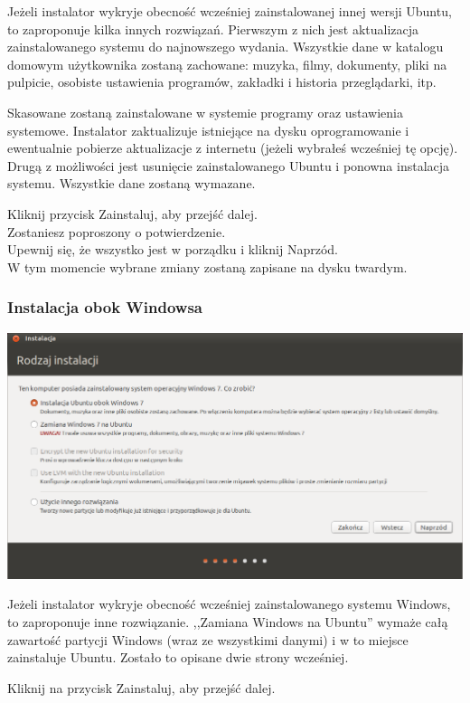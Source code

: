 Jeżeli instalator wykryje obecność wcześniej zainstalowanej innej wersji Ubuntu, to zaproponuje kilka innych rozwiązań.
Pierwszym z nich jest aktualizacja zainstalowanego systemu do najnowszego wydania. Wszystkie dane w katalogu domowym użytkownika zostaną zachowane: muzyka, filmy, dokumenty, pliki na pulpicie, osobiste ustawienia programów, zakładki i historia przeglądarki, itp.

Skasowane zostaną zainstalowane w systemie programy oraz ustawienia systemowe. Instalator zaktualizuje istniejące na dysku oprogramowanie i ewentualnie pobierze aktualizacje z internetu (jeżeli wybrałeś wcześniej tę opcję).
Drugą z możliwości jest usunięcie zainstalowanego Ubuntu i ponowna instalacja systemu. Wszystkie dane zostaną wymazane.
\begin{flushright}
Kliknij przycisk \textcolor{ubuntu_orange}{Zainstaluj}, aby przejść dalej.\\
Zostaniesz poproszony o potwierdzenie.\\
Upewnij się, że wszystko jest w porządku i kliknij \textcolor{ubuntu_orange}{Naprzód}.\\
W tym momencie wybrane zmiany zostaną zapisane na dysku twardym.
\end{flushright}
\clearpage
\subsubsection{Instalacja obok Windowsa}
\begin{center}
	\includegraphics[width=\linewidth]{images/instalator_partycjonowanie_obok_wondows7.png}
\end{center}

Jeżeli instalator wykryje obecność wcześniej zainstalowanego systemu Windows, to zaproponuje inne rozwiązanie. ,,Zamiana Windows na Ubuntu'' wymaże całą zawartość partycji Windows (wraz ze wszystkimi danymi) i w to miejsce zainstaluje Ubuntu. Zostało to opisane dwie strony wcześniej.
\begin{flushright}
Kliknij na przycisk \textcolor{ubuntu_orange}{Zainstaluj}, aby przejść dalej.
\end{flushright}


